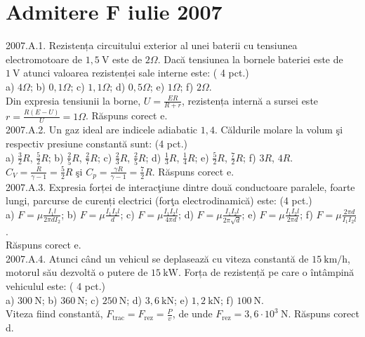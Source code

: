 \section{Admitere F iulie 2007}

2007.A.1. Rezistența circuitului exterior al unei baterii cu tensiunea electromotoare de $1,5 \mathrm{~V}$ este de $2 \Omega$. Dacă tensiunea la bornele bateriei este de $1 \mathrm{~V}$ atunci valoarea rezistenței sale interne este: ( 4 pct.)\\ a) $4 \Omega$; b) $0,1 \Omega$; c) $1,1 \Omega$; d) $0,5 \Omega$; e) $1 \Omega$; f) $2 \Omega$.\\ Din expresia tensiunii la borne, $U=\frac{E R}{R+r}$, rezistența internă a sursei este $r=\frac{R(E-U)}{U}=1 \Omega$. Răspuns corect e.\\

2007.A.2. Un gaz ideal are indicele adiabatic $1,4$. Căldurile molare la volum şi respectiv presiune constantă sunt: (4 pct.)\\ a) $\frac{3}{2} R$, $\frac{5}{2} R$; b) $\frac{2}{5} R$, $\frac{2}{7} R$; c) $\frac{2}{3} R$, $\frac{2}{5} R$; d) $\frac{1}{3} R$, $\frac{1}{4} R$; e) $\frac{5}{2} R$, $\frac{7}{2} R$; f) $3 R$, $4 R$.\\ $C_{V}=\frac{R}{\gamma-1}=\frac{5}{2} R$ şi $C_{p}=\frac{\gamma R}{\gamma-1}=\frac{7}{2} R$. Răspuns corect e.\\

2007.A.3. Expresia forței de interacţiune dintre două conductoare paralele, foarte lungi, parcurse de curenți electrici (forţa electrodinamică) este: (4 pct.)\\ a) $F=\mu \frac{I_{1} l}{2 \pi d I_{2}}$; b) $F=\mu \frac{I_{1} I_{2} l}{d}$; c) $F=\mu \frac{I_{1} I_{2} l}{4 \pi d}$; d) $F=\mu \frac{I_{1} I_{2} l}{2 \pi \sqrt{d}}$; e) $F=\mu \frac{I_{1} I_{2} l}{2 \pi d}$;  f) $F=\mu \frac{2 \pi d}{I_{1} I_{2} l}$.\\ Răspuns corect e.\\

2007.A.4. Atunci când un vehicul se deplasează cu viteza constantă de $15 \mathrm{~km} / \mathrm{h}$, motorul său dezvoltă o putere de $15 \mathrm{~kW}$. Forța de rezistență pe care o întâmpină vehiculul este: ( 4 pct.)\\ a) $300 \mathrm{~N}$; b) $360 \mathrm{~N}$; c) $250 \mathrm{~N}$; d) $3,6 \mathrm{~kN}$; e) $1,2 \mathrm{~kN}$; f) $100 \mathrm{~N}$.\\ Viteza fiind constantă, $F_{\text {trac}}=F_{\text {rez}}=\frac{P}{v}$, de unde $F_{\text {rez}}=3,6 \cdot 10^{3} \mathrm{~N}$. Răspuns corect d.\\

